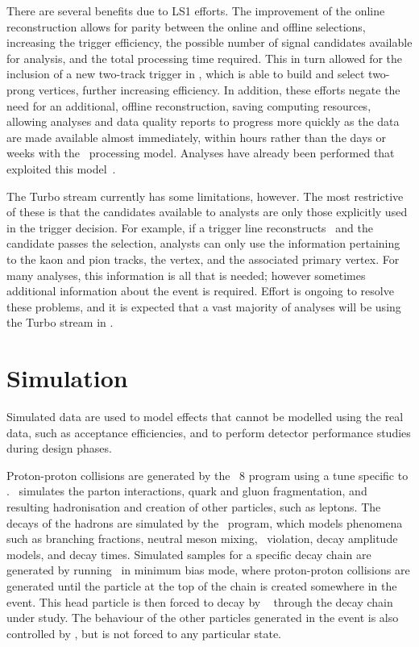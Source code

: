 There are several benefits due to \ac{LS1} efforts.
The improvement of the online reconstruction allows for parity between the 
online and offline selections, increasing the trigger efficiency, the possible 
number of signal candidates available for analysis, and the total processing 
time required.
This in turn allowed for the inclusion of a new two-track trigger in \hltone, 
which is able to build and select two-prong vertices, further increasing 
efficiency.
In addition, these efforts negate the need for an additional, offline 
reconstruction, saving computing resources,
 allowing analyses and data quality reports to progress more quickly as the 
 data are made available almost immediately, within hours rather than the days 
 or weeks with the \runone\ processing model.
 Analyses have already been performed that exploited this 
 model~\cite{LHCb-PAPER-2015-037,Aaij:2015bpa}.

 The Turbo stream currently has some limitations, however.
 The most restrictive of these is that the candidates available to analysts are 
 only those explicitly used in the trigger decision.
 For example, if a trigger line reconstructs \DzToKpi\ and the candidate passes 
 the selection, analysts can only use the information pertaining to the kaon 
 and pion tracks, the \PDzero vertex, and the associated primary vertex.
 For many analyses, this information is all that is needed; however sometimes 
 additional information about the event is required.
 Effort is ongoing to resolve these problems, and it is expected that a vast 
 majority of analyses will be using the Turbo stream in \runthree.

\section{Simulation}
\label{chap:intro:lhcb:simulation}

Simulated data are used to model effects that cannot be modelled using the real 
data, such as acceptance efficiencies, and to perform detector performance 
studies during design phases.

Proton-proton collisions are generated by the \pythia\ 8 program using a tune 
specific to \lhcb.
\pythia\ simulates the parton interactions, quark and gluon fragmentation, and 
resulting hadronisation and creation of other particles, such as leptons.
The decays of the hadrons are simulated by the \evtgen\ program, which models 
phenomena such as branching fractions, neutral meson mixing, \CP\ violation, 
decay amplitude models, and decay times.
Simulated samples for a specific decay chain are generated by running \pythia\ 
in minimum bias mode, where proton-proton collisions are generated until the 
particle at the top of the chain is created somewhere in the event.
This head particle is then forced to decay by \evtgen~\cite{Clemencic:2011zza} 
through the decay chain under study.
The behaviour of the other particles generated in the event is also controlled 
by \evtgen, but is not forced to any particular state.

